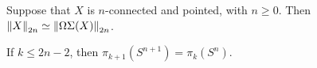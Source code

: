 \documentclass[hott-all.tex]{subfiles}
\begin{document}
% 
% 
\begin{cor} 
Suppose that $X$ is $n$-connected and pointed, with $n\geq 0$.
Then $\eqv{\trunc{2n}{X}}{\trunc{2n}{\Omega\susp(X)}}$.
\end{cor}
% 
% 
% 
% 
\begin{cor} 
If $k \le 2n-2$, then $\pi_{k+1}(S^{n+1}) = \pi_{k}(S^{n})$.
\end{cor}
%
%
\end{document}
